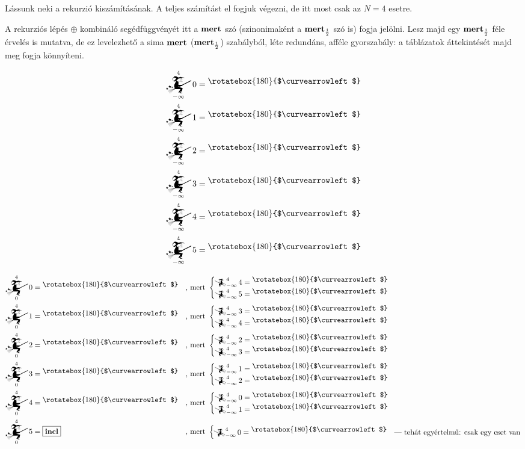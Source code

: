 \documentclass{article}
\newcommand{\nothing}{\text{\raisebox{0.4em}{\rotatebox{180}{$\curvearrowleft$}}}}%
\newcommand{\just}[1]{\boxed{#1}}%
\newcommand{\incl}{\mathbf{incl}}
\newcommand{\mainfunA}[3]{\mathwitch_{#2}^{#1}#3}
\newcommand{\mainfunB}[3]{\reversemathwitch_{#2}^{#1}#3}
\begin{document}
	Lássunk neki a rekurzió kiszámításának. A teljes számítást el fogjuk végezni, de itt most csak az $N = 4$ esetre.

	A rekurziós lépés $\oplus$ kombináló segédfüggvényét itt a $\text{\bf mert}$ szó (szinonimaként a $\text{\bf mert}_\frac12$ szó is) fogja jelölni. Lesz majd egy $\text{\bf mert}_\frac12$ féle érvelés is mutatva, de ez levelezhető a sima $\text{\bf mert}$ ($\text{\bf mert}_\frac12$) szabályból, léte redundáns, afféle gyorszabály: a táblázatok áttekintését majd meg fogja könnyíteni.

	
	\begin{align*}
		\mainfunA4{-\infty}0 &= \nothing \\
		\mainfunA4{-\infty}1 &= \nothing \\
		\mainfunA4{-\infty}2 &= \nothing \\
		\mainfunA4{-\infty}3 &= \nothing \\
		\mainfunA4{-\infty}4 &= \nothing \\
		\mainfunA4{-\infty}5 &= \nothing
	\end{align*}

	\begin{align*}
		\mainfunA4{0}0  &= \nothing    &&\text{, mert }\begin{cases}\mainfunB4{-\infty}4 = \nothing\\\mainfunB4{-\infty}5 = \nothing&\end{cases} \\
		\mainfunA4{0}1  &= \nothing    &&\text{, mert }\begin{cases}\mainfunB4{-\infty}3 = \nothing\\\mainfunB4{-\infty}4 = \nothing&\end{cases} \\
		\mainfunA4{0}2  &= \nothing    &&\text{, mert }\begin{cases}\mainfunB4{-\infty}2 = \nothing\\\mainfunB4{-\infty}3 = \nothing&\end{cases} \\
		\mainfunA4{0}3  &= \nothing    &&\text{, mert }\begin{cases}\mainfunB4{-\infty}1 = \nothing\\\mainfunB4{-\infty}2 = \nothing&\end{cases} \\
		\mainfunA4{0}4  &= \nothing    &&\text{, mert }\begin{cases}\mainfunB4{-\infty}0 = \nothing\\\mainfunB4{-\infty}1 = \nothing&\end{cases} \\
		\mainfunA4{0}5  &= \just \incl &&\text{, mert }\begin{cases}\mainfunB4{-\infty}0 = \nothing&\text{--- tehát egyértelmű: csak egy eset van}\end{cases}
	\end{align*}
\end{document}
